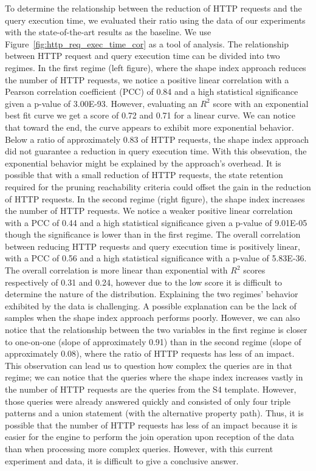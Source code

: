 To determine the relationship between the reduction of HTTP requests and the query execution time, we evaluated their ratio using 
the data of our experiments with the state-of-the-art results as the baseline.
We use Figure~\ref{fig:http_req_exec_time_cor} as a tool of analysis.
The relationship between HTTP request and query execution time can be divided into two regimes.
In the first regime (left figure), where the shape index approach reduces the number of HTTP requests, we notice a positive linear correlation with a
Pearson correlation coefficient (PCC) of 0.84 and a high statistical significance given a p-value of 3.00E-93.
However, evaluating an $R^2$ score with an exponential best fit curve we get a score of 0.72 and 0.71 for a linear curve.
We can notice that toward the end, the curve appears to exhibit more exponential behavior.
Below a ratio of approximately 0.83 of HTTP requests, the shape index approach did not guarantee a reduction in query execution time.
With this obsevation, the exponential behavior might be explained by the approach's overhead. 
It is possible that with a small reduction of HTTP requests, the state retention required for the pruning reachability criteria could offset the gain in the reduction of HTTP requests.
In the second regime (right figure), the shape index increases the number of HTTP requests.
We notice a weaker positive linear correlation with a PCC of 0.44 and a high statistical significance given a p-value of 9.01E-05 though the significance is lower than in the first regime.
The overall correlation between reducing HTTP requests and query execution time is positively linear, with a PCC of 0.56 and a high statistical significance with a p-value of 5.83E-36.
The overall correlation is more linear than exponential with $R^2$ scores respectively of 0.31 and 0.24, however due to the low score it is difficult to determine the nature of the distribution.
Explaining the two regimes' behavior exhibited by the data is challenging.
A possible explanation can be the lack of samples when the shape index approach performs poorly.
However, we can also notice that the relationship between the two variables in the first regime is closer to one-on-one (slope of approximately 0.91) than in the second regime (slope of approximately 0.08), where the ratio of HTTP requests has less of an impact.
This observation can lead us to question how complex the queries are in that regime; we can notice that the queries where the shape index increases vastly in the number 
of HTTP requests are the queries from the S4 template. 
However, those queries were already answered quickly and consisted of only four triple patterns and a union statement (with the alternative property path). 
Thus, it is possible that the number of HTTP requests has less of an impact because it is easier for the engine to perform the join operation upon reception of the data than when processing more complex queries.
However, with this current experiment and data, it is difficult to give a conclusive answer.


